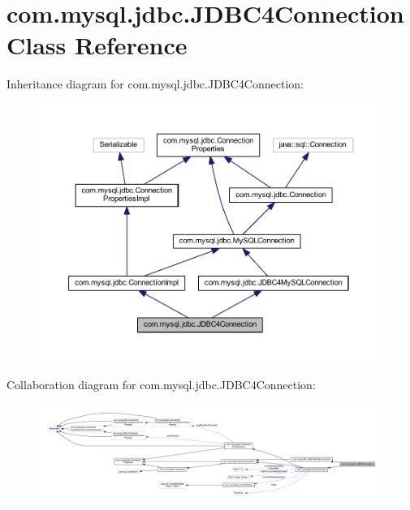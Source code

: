\hypertarget{classcom_1_1mysql_1_1jdbc_1_1_j_d_b_c4_connection}{}\section{com.\+mysql.\+jdbc.\+J\+D\+B\+C4\+Connection Class Reference}
\label{classcom_1_1mysql_1_1jdbc_1_1_j_d_b_c4_connection}


Inheritance diagram for com.\+mysql.\+jdbc.\+J\+D\+B\+C4\+Connection\+:
\nopagebreak
\begin{figure}[H]
\begin{center}
\leavevmode
\includegraphics[width=350pt]{classcom_1_1mysql_1_1jdbc_1_1_j_d_b_c4_connection__inherit__graph}
\end{center}
\end{figure}


Collaboration diagram for com.\+mysql.\+jdbc.\+J\+D\+B\+C4\+Connection\+:
\nopagebreak
\begin{figure}[H]
\begin{center}
\leavevmode
\includegraphics[width=350pt]{classcom_1_1mysql_1_1jdbc_1_1_j_d_b_c4_connection__coll__graph}
\end{center}
\end{figure}
